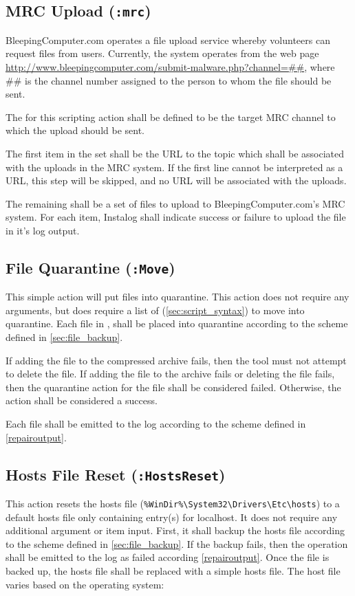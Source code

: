 \subsection{MRC Upload (\texttt{:mrc})}
BleepingComputer.com operates a file upload service whereby volunteers can
request files from users. Currently, the system operates from the web page
\url{http://www.bleepingcomputer.com/submit-malware.php?channel=##}, where \#\#
is the channel number assigned to the person to whom the file should be sent.

The  for this scripting action shall be defined to be the target MRC
channel to which the upload should be sent.

The first item in the set  shall be the URL to the topic which shall
be associated with the uploads in the MRC system. If the first line cannot be
interpreted as a URL, this step will be skipped, and no URL will be associated
with the uploads.

The remaining  shall be a set of files to upload to
BleepingComputer.com's MRC system. For each item, Instalog shall indicate
success or failure to upload the file in it's log output.

\subsection{File Quarantine (\texttt{:Move})}
This simple action will put files into quarantine.  This action does not require
any arguments, but does require a list of  (\ref{sec:script_syntax})
to move into quarantine.  Each file in , shall be placed into
quarantine according to the scheme defined in \ref{sec:file_backup}.

If adding the file to the compressed archive fails, then the tool must not
attempt to delete the file.  If adding the file to the archive fails or deleting
the file fails, then the quarantine action for the file shall be considered
failed.  Otherwise, the action shall be considered a success.  

Each file shall be emitted to the log according to the scheme defined in
\ref{repairoutput}.

\subsection{Hosts File Reset (\texttt{:HostsReset})}
This action resets the hosts file (\verb|%WinDir%\System32\Drivers\Etc\hosts|)
to a default hosts file only containing entry(s) for localhost.  It does not
require any additional argument or item input. First, it shall backup the hosts
file according to the scheme defined in \ref{sec:file_backup}.  If the backup
fails, then the operation shall be emitted to the log as failed according
\ref{repairoutput}. Once the file is backed up, the hosts file shall be replaced
with a simple hosts file.  The host file varies based on the operating system:

